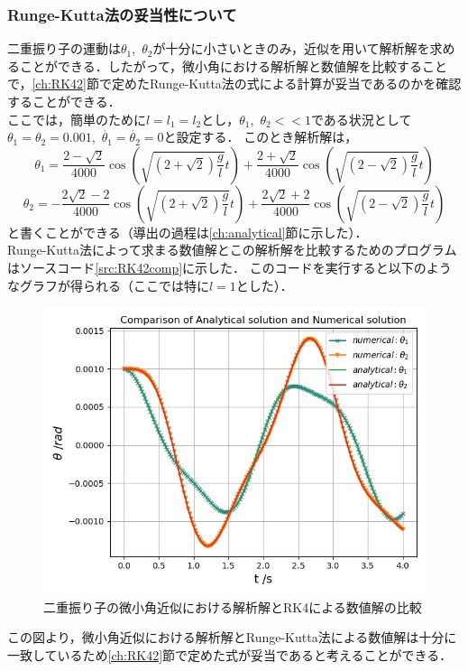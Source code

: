 \documentclass[a4paper,11pt]{jsarticle}
\begin{document}
\subsubsection{Runge-Kutta法の妥当性について}
二重振り子の運動は\(\theta_1\),\ \(\theta_2\)が十分に小さいときのみ，近似を用いて解析解を求めることができる．したがって，微小角における解析解と数値解を比較することで，\ref{ch:RK42}節で定めたRunge-Kutta法の式による計算が妥当であるのかを確認することができる．\\
ここでは，簡単のために\(l = l_1 = l_2\)とし，\(\theta_1\),\ \(\theta_2 << 1\)である状況として\(\theta_1 = \theta_2 = 0.001\),\ \(\dot{\theta_1} = \dot{\theta_2} = 0\)と設定する．
このとき解析解は，
\begin{equation}
  \theta_1 = \dfrac{2-\sqrt{2}}{4000}\cos{(\sqrt{(2+\sqrt{2})\dfrac{g}{l}}t)} + \dfrac{2+\sqrt{2}}{4000}\cos{(\sqrt{(2-\sqrt{2})\dfrac{g}{l}}t)}
\end{equation}
\begin{equation}
  \theta_2 = -\dfrac{2\sqrt{2}-2}{4000}\cos{(\sqrt{(2+\sqrt{2})\dfrac{g}{l}}t)} + \dfrac{2\sqrt{2}+2}{4000}\cos{(\sqrt{(2-\sqrt{2})\dfrac{g}{l}}t)}
\end{equation}
と書くことができる（導出の過程は\ref{ch:analytical}節に示した）．\\
Runge-Kutta法によって求まる数値解とこの解析解を比較するためのプログラムはソースコード\ref{src:RK42comp}に示した．
このコードを実行すると以下のようなグラフが得られる（ここでは特に\(l=1\)とした）．
\begin{figure}[H]
  \begin{center}
    \includegraphics[scale=0.9]{figure/RK42/comparison1/2021-2-9-143754.jpeg}
    \caption{二重振り子の微小角近似における解析解とRK4による数値解の比較}
    \label{fig:RK42comp}
  \end{center}
\end{figure}
この図より，微小角近似における解析解とRunge-Kutta法による数値解は十分に一致しているため\ref{ch:RK42}節で定めた式が妥当であると考えることができる．
\newpage
\end{document}
